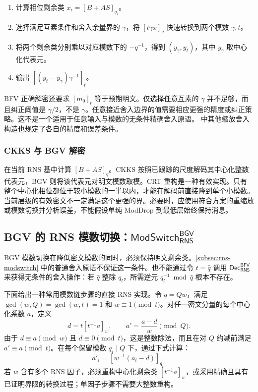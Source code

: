 \begin{tcolorbox}[title={\textbf{\tboxlabel{\ref*{subsubsec:rns-dec-bfv}} $\textsf{Dec}_{\textsf{RNS}}^{\textsf{BFV}}$}}]
\begin{enumerate}
\item 计算相位剩余类 $x_i=[B+AS]_{q_i}$。
\item 选择满足互素条件和舍入余量界的 $\gamma$，将 $[t\gamma x]_q$ 快速转换到两个模数 $\gamma,t$。
\item 将两个剩余类分别乘以对应模数下的 $-q^{-1}$，得到 $(y_\gamma,y_t)$，其中 $y_\gamma$ 取中心化代表元。
\item 输出 $[(y_t-y_\gamma)\gamma^{-1}]_t$。
\end{enumerate}
\end{tcolorbox}

BFV 正确解密还要求 $[m_0]_t$ 等于预期明文。仅选择任意互素的 $\gamma$ 并不足够，而且纠正阈值是 $\gamma/2$，不是 $\gamma$。任意接近舍入边界的值需要相应更强的精度或纠正策略。这不是一个适用于任意输入与模数的无条件精确舍入原语。\cite{rns-bfv-hps} 中其他缩放舍入构造也规定了各自的精度和误差条件。


\subsubsection{CKKS 与 BGV 解密}
\label{subsubsec:rns-dec-ckks-bgv}

在当前 RNS 基中计算 $[B+AS]_q$。CKKS 按照已跟踪的尺度解码其中心化整数代表元，BGV 则将该代表元对明文模数取模。CRT 重构是一种有效实现。只有整个中心化相位都位于较小模数的一半以内，才能在解码前直接降到单个小模数。当前层级的有效密文不一定满足这个更强的界。必要时，应使用符合方案的重缩放或模数切换并分析误差，不能假设单纯 \textsf{ModDrop} 到最低层始终保持消息。

\subsection{BGV 的 RNS 模数切换：$\textsf{ModSwitch}_{\textsf{RNS}}^{\textsf{BGV}}$}
\label{subsec:rns-modswitch-bgv}

BGV 模数切换在降低密文模数的同时，必须保持明文剩余类。\autoref{subsec:rns-modswitch} 中的普通舍入原语不保证这一条件。也不能通过令 $t=\hat q$ 调用 $\textsf{Dec}_{\textsf{RNS}}^{\textsf{BFV}}$ 来获得无条件的舍入操作：若 $\hat q$ 整除 $q_l$，所需逆元 $q_l^{-1}\bmod\hat q$ 根本不存在。

下面给出一种常用模数链步骤的直接 RNS 实现。令 $q=Qw$，满足 $\gcd(w,Q)=\gcd(w,t)=1$ 和 $w\equiv1\pmod t$。对任一密文分量的每个中心化系数 $a$，定义
\[
d=t[t^{-1}a]_w,\qquad a'=\frac{a-d}{w}\pmod Q.
\]
由于 $d\equiv a\pmod w$ 且 $d\equiv0\pmod t$，这是整数除法，而且在对 $Q$ 约减前满足 $a'\equiv a\pmod t$。在每个保留模数 $q_i\mid Q$ 下，通过下式计算：
\[
a'_i=[w^{-1}(a_i-d)]_{q_i}.
\]
若 $w$ 含有多个 RNS 因子，必须重构中心化剩余类 $[t^{-1}a]_w$，或采用精确且具有已证明界限的转换过程；单因子步骤不需要大整数重构。

